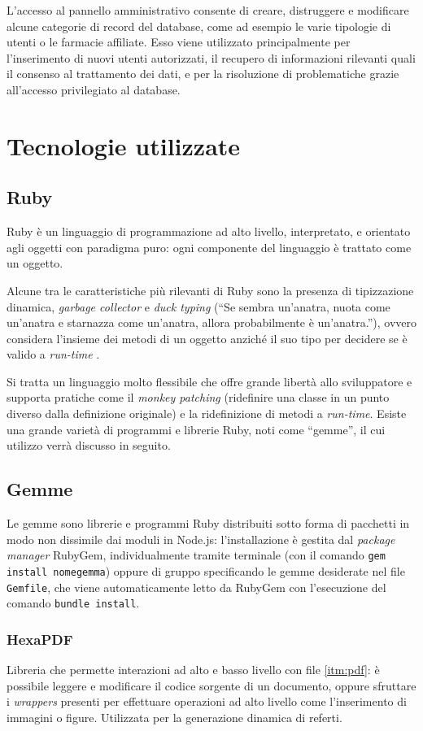L'accesso al pannello amministrativo consente di creare, distruggere e modificare alcune categorie di record del database, come ad esempio le varie tipologie di utenti o le farmacie affiliate. Esso viene utilizzato principalmente per l'inserimento di nuovi utenti autorizzati, il recupero di informazioni rilevanti quali il consenso al trattamento dei dati, e per la risoluzione di problematiche grazie all'accesso privilegiato al database.

\section{Tecnologie utilizzate}
\subsection{Ruby}
Ruby è un linguaggio di programmazione ad alto livello, interpretato, e orientato agli oggetti con paradigma puro: ogni componente del linguaggio è trattato come un oggetto. 

Alcune tra le caratteristiche più rilevanti di Ruby sono la presenza di tipizzazione dinamica, \textit{garbage collector} e \textit{duck typing} (``Se sembra un'anatra, nuota come un'anatra e starnazza come un'anatra, allora probabilmente è un'anatra.''), ovvero considera l'insieme dei metodi di un oggetto anziché il suo tipo per decidere se è valido a \textit{run-time} .

Si tratta un linguaggio molto flessibile che offre grande libertà allo sviluppatore e supporta pratiche come il \textit{monkey patching} (ridefinire una classe in un punto diverso dalla definizione originale) e la ridefinizione di metodi a \textit{run-time}.
Esiste una grande varietà di programmi e librerie Ruby, noti come ``gemme'', il cui utilizzo verrà discusso in seguito.

\subsection{Gemme}
Le gemme sono librerie e programmi Ruby distribuiti sotto forma di pacchetti in modo non dissimile dai moduli in Node.js: l'installazione è gestita dal \textit{package manager} RubyGem, individualmente tramite terminale (con il comando \texttt{gem install nomegemma}) oppure di gruppo specificando le gemme desiderate nel file \texttt{Gemfile}, che viene automaticamente letto da RubyGem con l'esecuzione del comando \texttt{bundle install}.

\subsubsection{HexaPDF}
Libreria che permette interazioni ad alto e basso livello con file \ref{itm:pdf}: è possibile leggere e modificare il codice sorgente di un documento, oppure sfruttare i \textit{wrappers} presenti per effettuare operazioni ad alto livello come l'inserimento di immagini o figure. Utilizzata per la generazione dinamica di referti.

